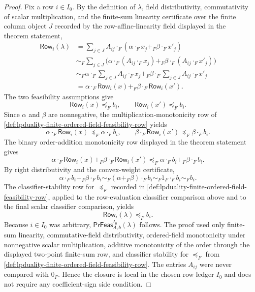 \begin{proof}
Fix a row $i\in I_0$. By the definition of $\lambda$, field distributivity, commutativity of scalar multiplication, and the finite-sum linearity certificate over the finite column object $J$ recorded by the row-affine-linearity field displayed in the theorem statement,
$$
\begin{aligned}
\mathsf{Row}_{i}(\lambda)
&=\sum_{j\in J} A_{ij}\cdot_F(\alpha\cdot_F x_j+_F\beta\cdot_F x'_j)\\
&\sim_F
\sum_{j\in J}\bigl(\alpha\cdot_F(A_{ij}\cdot_F x_j)+_F
\beta\cdot_F(A_{ij}\cdot_F x'_j)\bigr)\\
&\sim_F
\alpha\cdot_F\sum_{j\in J}A_{ij}\cdot_F x_j
+_F
\beta\cdot_F\sum_{j\in J}A_{ij}\cdot_F x'_j\\
&=
\alpha\cdot_F \mathsf{Row}_{i}(x)+_F\beta\cdot_F \mathsf{Row}_{i}(x').
\end{aligned}
$$
The two feasibility assumptions give
$$
\mathsf{Row}_{i}(x)\preceq_F b_i,
\qquad
\mathsf{Row}_{i}(x')\preceq_F b_i .
$$
Since $\alpha$ and $\beta$ are nonnegative, the multiplication-monotonicity row of \autoref{def:lpduality-finite-ordered-field-feasibility-row} yields
$$
\alpha\cdot_F\mathsf{Row}_{i}(x)\preceq_F \alpha\cdot_F b_i,
\qquad
\beta\cdot_F\mathsf{Row}_{i}(x')\preceq_F \beta\cdot_F b_i .
$$
The binary order-addition monotonicity row displayed in the theorem statement gives
$$
\alpha\cdot_F\mathsf{Row}_{i}(x)+_F\beta\cdot_F\mathsf{Row}_{i}(x')
\preceq_F
\alpha\cdot_F b_i+_F\beta\cdot_F b_i .
$$
By right distributivity and the convex-weight certificate,
$$
\alpha\cdot_F b_i+_F\beta\cdot_F b_i
\sim_F
(\alpha+_F\beta)\cdot_F b_i
\sim_F
1_F\cdot_F b_i
\sim_F
b_i .
$$
The classifier-stability row for $\preceq_F$ recorded in \autoref{def:lpduality-finite-ordered-field-feasibility-row}, applied to the row-evaluation classifier comparison above and to the final scalar classifier comparison, yields
$$
\mathsf{Row}_{i}(\lambda)\preceq_F b_i .
$$
Because $i\in I_0$ was arbitrary, $\mathsf{PrFeas}_{A,b}^{I_0}(\lambda)$ follows.
The proof used only finite-sum linearity, commutative-field distributivity, ordered-field monotonicity under nonnegative scalar multiplication, additive monotonicity of the order through the displayed two-point finite-sum row, and classifier stability for $\preceq_F$ from \autoref{def:lpduality-finite-ordered-field-feasibility-row}. The entries $A_{ij}$ were never compared with $0_F$. Hence the closure is local in the chosen row ledger $I_0$ and does not require any coefficient-sign side condition.
\end{proof}


